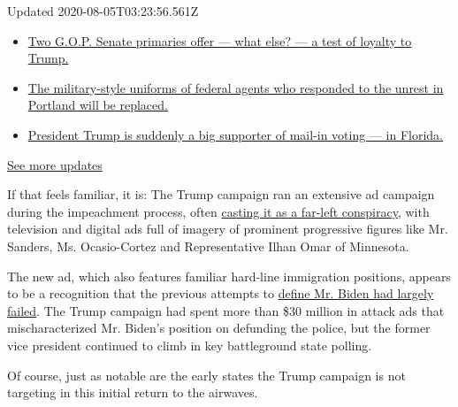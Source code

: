 Updated 2020-08-05T03:23:56.561Z

\begin{itemize}
\tightlist
\item
  \href{https://www.nytimes.com/2020/08/04/us/elections/primary-election-michigan-arizona-kansas.html?action=click\&pgtype=Article\&state=default\&region=MAIN_CONTENT_1\&context=storylines_live_updates\#link-3924dd44}{Two
  G.O.P. Senate primaries offer --- what else? --- a test of loyalty to
  Trump.}
\item
  \href{https://www.nytimes.com/2020/08/04/us/elections/primary-election-michigan-arizona-kansas.html?action=click\&pgtype=Article\&state=default\&region=MAIN_CONTENT_1\&context=storylines_live_updates\#link-62a8e06b}{The
  military-style uniforms of federal agents who responded to the unrest
  in Portland will be replaced.}
\item
  \href{https://www.nytimes.com/2020/08/04/us/elections/primary-election-michigan-arizona-kansas.html?action=click\&pgtype=Article\&state=default\&region=MAIN_CONTENT_1\&context=storylines_live_updates\#link-32b39e33}{President
  Trump is suddenly a big supporter of mail-in voting --- in Florida.}
\end{itemize}

\href{https://www.nytimes.com/2020/08/04/us/elections/primary-election-michigan-arizona-kansas.html?action=click\&pgtype=Article\&state=default\&region=MAIN_CONTENT_1\&context=storylines_live_updates}{See
more updates}

If that feels familiar, it is: The Trump campaign ran an extensive ad
campaign during the impeachment process, often
\href{https://www.nytimes.com/2019/10/28/us/politics/impeachment-ads-facebook.html}{casting
it as a far-left conspiracy}, with television and digital ads full of
imagery of prominent progressive figures like Mr. Sanders, Ms.
Ocasio-Cortez and Representative Ilhan Omar of Minnesota.

The new ad, which also features familiar hard-line immigration
positions, appears to be a recognition that the previous attempts to
\href{https://www.nytimes.com/2020/07/10/us/biden-trump.html}{define Mr.
Biden had largely failed}. The Trump campaign had spent more than \$30
million in attack ads that mischaracterized Mr. Biden's position on
defunding the police, but the former vice president continued to climb
in key battleground state polling.

Of course, just as notable are the early states the Trump campaign is
not targeting in this initial return to the airwaves.

